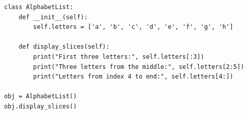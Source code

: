 \begin{verbatim}
class AlphabetList:
    def __init__(self):
        self.letters = ['a', 'b', 'c', 'd', 'e', 'f', 'g', 'h']

    def display_slices(self):
        print("First three letters:", self.letters[:3])
        print("Three letters from the middle:", self.letters[2:5])
        print("Letters from index 4 to end:", self.letters[4:])

obj = AlphabetList()
obj.display_slices()
\end{verbatim}